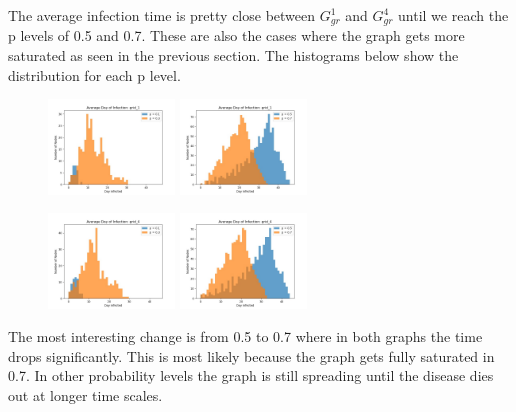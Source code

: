 \documentclass[letterpaper,9pt]{article}
\begin{document}
\begin{enumerate}
    The average infection time is pretty close between $G^{1}_{gr}$ and $G^{4}_{gr}$ 
    until we reach the p levels of 0.5 and 0.7. These are also the cases where
    the graph gets more saturated as seen in the previous section. The 
    histograms below show the distribution for each p level.

    \begin{figure}[htpb]
        \centering
        \includegraphics[width=0.3\textwidth]{histogram_grid_1_0_3.jpg}
        \includegraphics[width=0.3\textwidth]{histogram_grid_1_0_7.jpg}
    \end{figure} 

    \begin{figure}[htpb]
        \centering
        \includegraphics[width=0.3\textwidth]{histogram_grid_4_0_3.jpg}
        \includegraphics[width=0.3\textwidth]{histogram_grid_4_0_7.jpg}
    \end{figure} 

    The most interesting
    change is from 0.5 to 0.7 where in both graphs the time drops significantly. 
    This is most likely because the graph gets fully saturated in 0.7. In other 
    probability levels the graph is still spreading until the disease dies out 
    at longer time scales.



\end{enumerate}
\end{document}
